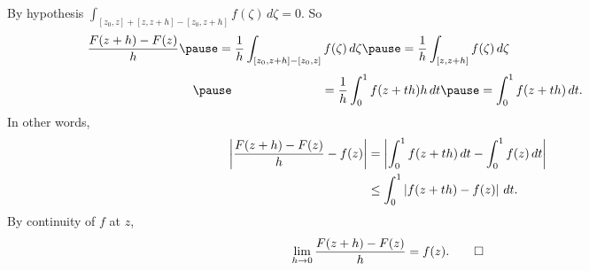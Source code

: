 \documentclass[10pt,aspectratio=169]{beamer}
\begin{document}
\begin{frame}

By hypothesis $\displaystyle \int_{[z_0,z]+[z,z+h]-[z_0,z+h]} f(\zeta) \,
d\zeta = 0 $.
\pause
So
\[
\frac{F(z+h)-F(z)}{h}
\pause
=
\frac{1}{h}
\int_{[z_0,z+h]-[z_0,z]} f(\zeta) \, d\zeta
\pause
=
\frac{1}{h}
\int_{[z,z+h]} f(\zeta) \, d\zeta
\hspace*{2.0in}
\]
\[
\pause
\hspace*{1in}
=
\frac{1}{h}
\int_0^1 f(z+th) h \, dt
\pause
=
\int_0^1 f(z+th) \, dt .
\]
\pause
\vspace*{-0.1in}
In other words,
\vspace*{-0.1in}
\begin{equation*}
\begin{split}
\left\lvert {
\frac{F(z+h)-F(z)}{h} 
-
f(z)
} \right\rvert
& =
\left\lvert {
\int_0^1 f(z+th) \, dt
-
\int_0^1 f(z) \, dt
} \right\rvert
\\
& \leq
\int_0^1 \left\lvert {f(z+th)-f(z)} \right\rvert \, dt .
\end{split}
\end{equation*}
\pause
By continuity of $f$ at $z$,
\begin{equation*}
\lim_{h \to 0}
\frac{F(z+h)-F(z)}{h} 
=
f(z) . \qed
\end{equation*}

\end{frame}
\end{document}
